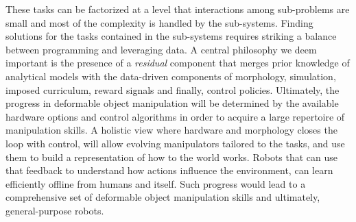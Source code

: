 \documentclass[\home/main.tex]{subfiles}
\begin{document}
These tasks can be factorized at a level that interactions among sub-problems are small and most of the complexity is handled by the sub-systems. %
Finding solutions for the tasks contained in the sub-systems requires striking a balance between programming and leveraging data. A central philosophy we deem important is the presence of a \emph{residual} component that merges prior knowledge of analytical models with the data-driven components of morphology, simulation, imposed curriculum, reward signals and finally, control policies. 
Ultimately, the progress in deformable object manipulation will be determined by the available hardware options and control algorithms in order to acquire a large repertoire of manipulation skills. A holistic view where hardware and morphology closes the loop with control, will allow  evolving manipulators tailored to the tasks, and use them to build a representation of how to the world works. %
Robots that can use that feedback to understand how actions influence the environment, can learn efficiently offline from humans and itself. Such progress would lead to a comprehensive set of deformable object manipulation skills and ultimately, general-purpose robots. 


\end{document}

